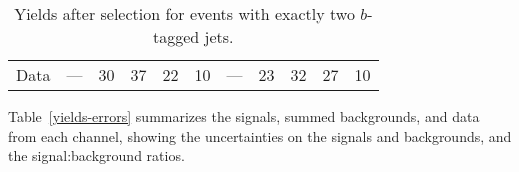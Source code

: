 \begin{table}[!h!tbp]
\begin{center}
\begin{minipage}{6in}
\begin{ruledtabular}
\begin{tabular}{l||ccccc|ccccc}
\hline                                                                                       
Data                     &  --- &   30  &   37  &   22  &  10  &  --- &   23  &   32  &   27  &  10  
\end{tabular}
\end{ruledtabular}
\vspace{-0.1in}
\caption[twotagyields]{Yields after selection for events with exactly
two $b$-tagged jets.}
\label{twotag-yields}
\end{minipage}
\end{center}
\end{table}

\clearpage

Table~\ref{yields-errors} summarizes the signals, summed backgrounds,
and data from each channel, showing the uncertainties on the signals
and backgrounds, and the signal:background ratios.

